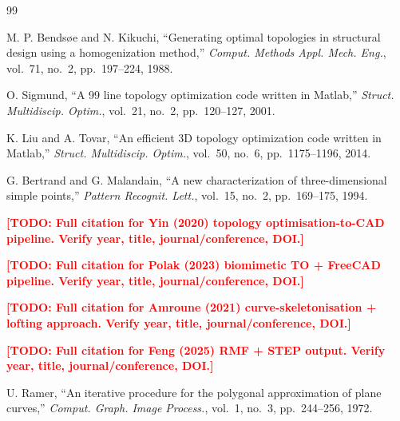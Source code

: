 \documentclass[11pt,a4paper]{article}
\newcommand{\TODO}[1]{\textcolor{red}{\textbf{[TODO: #1]}}}
\begin{document}



\begin{thebibliography}{99}

M. P. Bendsøe and N. Kikuchi,
``Generating optimal topologies in structural design using a homogenization
method,''
\textit{Comput. Methods Appl. Mech. Eng.}, vol.~71, no.~2, pp.~197--224, 1988.

O. Sigmund,
``A 99 line topology optimization code written in Matlab,''
\textit{Struct. Multidiscip. Optim.}, vol.~21, no.~2, pp.~120--127, 2001.

K. Liu and A. Tovar,
``An efficient 3D topology optimization code written in Matlab,''
\textit{Struct. Multidiscip. Optim.}, vol.~50, no.~6, pp.~1175--1196, 2014.

G. Bertrand and G. Malandain,
``A new characterization of three-dimensional simple points,''
\textit{Pattern Recognit. Lett.}, vol.~15, no.~2, pp.~169--175, 1994.

\TODO{Full citation for Yin (2020) topology optimisation-to-CAD pipeline.
Verify year, title, journal/conference, DOI.}

\TODO{Full citation for Polak (2023) biomimetic TO + FreeCAD pipeline.
Verify year, title, journal/conference, DOI.}

\TODO{Full citation for Amroune (2021) curve-skeletonisation + lofting approach.
Verify year, title, journal/conference, DOI.}

\TODO{Full citation for Feng (2025) RMF + STEP output.
Verify year, title, journal/conference, DOI.}

U. Ramer,
``An iterative procedure for the polygonal approximation of plane curves,''
\textit{Comput. Graph. Image Process.}, vol.~1, no.~3, pp.~244--256, 1972.

\end{thebibliography}
\end{document}
